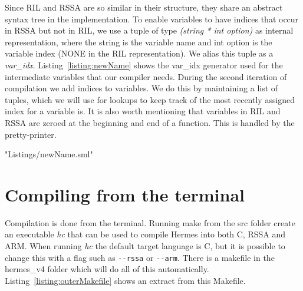 \label{chapt - implementation}
Since RIL and RSSA are so similar in their structure, they share an abstract syntax tree in the implementation.
To enable variables to have indices that occur in RSSA but not in RIL, we use a tuple of type \emph{(string * int option)} as internal representation, where the string is the variable name and int option is the variable index (NONE in the RIL representation).
We alias this tuple as a \emph{var\_idx}.
Listing~\ref{listing:newName} shows the var\_idx generator used for the intermediate variables that our compiler needs.
During the second iteration of compilation we add indices to variables.
We do this by maintaining a list of tuples, which we will use for lookups to keep track of the most recently assigned index for a variable is.
It is also worth mentioning that variables in RIL and RSSA are zeroed at the beginning and end of a function. This is handled by the pretty-printer.

 {"Listings/newName.sml"}

\section{Compiling from the terminal}
Compilation is done from the terminal.
Running make from the src folder create an executable \emph{hc} that can be used to compile Hermes into both C, RSSA and ARM.
When running \emph{hc} the default target language is C, but it is possible to change this with a flag such as \lstinline{--rssa} or \lstinline{--arm}.
There is a makefile in the hermes\_v4 folder which will do all of this automatically. Listing~\ref{listing:outerMakefile} shows an extract from this Makefile.


